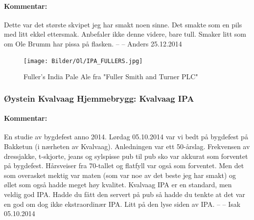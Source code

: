 \documentclass[12pt,a4paper,oneside,norsk]{article}
\begin{document}
\paragraph{Kommentar:} Dette var det største skvipet jeg har smakt noen sinne. Det smakte som en pils med litt ekkel ettersmak. Anbefaler ikke denne videre, bare tull. Smaker litt som om Ole Brumm har pissa på flasken.
\newline
-- -- Anders 25.12.2014

\begin{figure} [H]
\centering
\texttt{[image: Bilder/Ol/IPA\_FULLERS.jpg]}
\caption{Fuller's India Pale Ale fra "Fuller Smith and Turner PLC"}
\end{figure}

\newpage
\subsubsection{Øystein Kvalvaag Hjemmebrygg: Kvalvaag IPA}
\paragraph{Kommentar:} En studie av bygdefest anno 2014. Lørdag 05.10.2014 var vi bedt på bygdefest på Bakketun (i nærheten av Kvalvaag). Anledningen var ett 50-årslag. Frekvensen av dressjakke, t-skjorte, jeans og sylspisse pub til pub sko var akkurat som forventet på bygdefest. Hårsveiser fra 70-tallet og flatfyll var også som forventet. Men det som overasket mektig var maten (som var noe av det beste jeg har smakt) og øllet som også hadde meget høy kvalitet. Kvalvaag IPA er en standard, men veldig god IPA. Hadde du fått den servert på pub så hadde du tenkte at det var en god om dog ikke ekstraordinær IPA. Litt på den lyse siden av IPA.
\newline
-- -- Isak 05.10.2014
\end{document}
